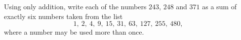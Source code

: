 Using only addition, write each of the numbers $243$, $248$ and $371$ as a sum of exactly six numbers taken from the list
\[
1,\ 2,\ 4,\ 9,\ 15,\ 31,\ 63,\ 127,\ 255,\ 480,
\]
where a number may be used more than once.
